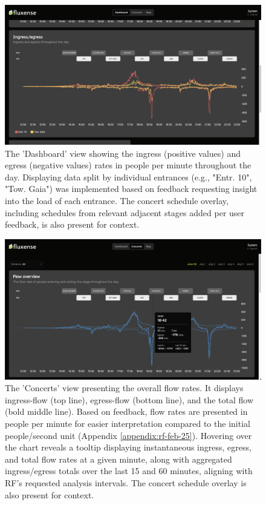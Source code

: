 \begin{figure}[H]
  \centering
  \includegraphics[width=\textwidth]{Pictures/Misc/Frontend/ingress_egress.png}
  \caption{The 'Dashboard' view showing the ingress (positive values) and egress (negative values) rates in people per minute throughout the day. Displaying data split by individual entrances (e.g., "Entr. 10", "Tow. Gaia") was implemented based on feedback requesting insight into the load of each entrance. The concert schedule overlay, including schedules from relevant adjacent stages added per user feedback, is also present for context.}
  \label{fig:showcase:ingress-egress}

\end{figure}


\begin{figure}[H]
  \centering
  \includegraphics[width=\textwidth]{Pictures/Misc/Frontend/flow_total.png}
  \caption{The 'Concerts' view presenting the overall flow rates. It displays ingress-flow (top line), egress-flow (bottom line), and the total flow (bold middle line). Based on feedback, flow rates are presented in people per minute for easier interpretation compared to the initial people/second unit (Appendix \ref{appendix:rf-feb-25}). Hovering over the chart reveals a tooltip displaying instantaneous ingress, egress, and total flow rates at a given minute, along with aggregated ingress/egress totals over the last 15 and 60 minutes, aligning with RF's requested analysis intervals. The concert schedule overlay is also present for context.}
  \label{fig:showcase:flow-total}

\end{figure}

